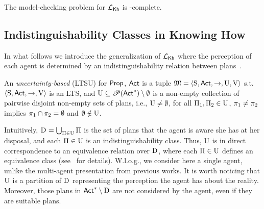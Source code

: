 \begin{proposition}
    The model-checking problem for $\mathcal{L}_{{\mathsf{Kh}}}$ is \PSPACE-complete.
\end{proposition}

\subsection{Indistinguishability Classes in Knowing How}

In what follows we introduce the generalization of $\mathcal{L}_{{\mathsf{Kh}}}$ where the perception of each agent is determined by an indistinguishability relation between plans~\cite{AFSVQ21,AFSVQ23}. 

\begin{definition}\label{def:ults}
    An \emph{uncertainty-based \lts} (LTSU) for ${\rm \sf Prop}$, ${\rm \sf Act}$ is a tuple     $\mathfrak{M}=\langle{\operatorname{S},{\rm \sf Act},\rightarrow,\operatorname{U},\operatorname{V}}\rangle$ s.t. $\langle{\operatorname{S},{\rm \sf Act},\rightarrow,\operatorname{V}}\rangle$ is an LTS, and 
    $\operatorname{U}\subseteq \mathscr{P}({\rm \sf Act}^*)\setminus \emptyset$ is a non-empty collection of pairwise disjoint non-empty sets of plans, i.e., $\operatorname{U}\neq\emptyset$, for all $\Pi_1,\Pi_2\in\operatorname{U}$, $\pi_1\neq\pi_2$ implies  $\pi_1\cap\pi_2=\emptyset$ and $\emptyset\notin\operatorname{U}$. 

    \end{definition}
    
Intuitively, $\operatorname{D}_{} = \bigcup_{\Pi \in \operatorname{U}} \Pi$ is the set of plans that the  agent is aware she has at her disposal, and each $\Pi \in \operatorname{U}$ is an indistinguishability class. Thus, $\operatorname{U}$ is in direct correspondence to an equivalence relation over $\operatorname{D}_{}$, where each $\Pi\in\operatorname{U}$ defines an equivalence class (see~\cite{AFSVQ21,AFSVQ23} for details). W.l.o.g., we consider here a single agent, unlike the multi-agent presentation from previous works.
%
It is worth noticing that  $\operatorname{U}$ is a partition of $\operatorname{D}_{}$ representing the perception the agent has about the reality.  Moreover, those plans in ${\rm \sf Act}^*\setminus\operatorname{D}_{}$ are not considered by the agent, even if they are suitable plans. 


